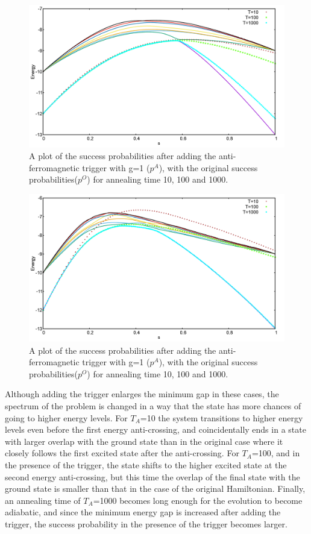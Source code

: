\documentclass[../main.tex]{subfiles}
\begin{document}
\begin{figure}[H]
\centering 
\includegraphics[scale=0.3]{705_O_T.png}
\caption{A plot of the success probabilities after adding the anti-ferromagnetic trigger with g=1 ($p^A$), with the original success probabilities($p^O$) for annealing time 10, 100 and 1000.}
\label{fig:a24}
\end{figure}
\begin{figure}[H]
\centering 
\includegraphics[scale=0.3]{705_A_T_g1.png}
\caption{A plot of the success probabilities after adding the anti-ferromagnetic trigger with g=1 ($p^A$), with the original success probabilities($p^O$) for annealing time 10, 100 and 1000.}
\label{fig:a25}
\end{figure}
Although adding the trigger enlarges the minimum gap in these cases, the spectrum of the problem is changed in a way that the state has more chances of going to higher energy levels. For $T_A$=10 the system transitions to higher energy levels even before the first energy anti-crossing, and coincidentally ends in a state with larger overlap with the ground state than in the original case where it closely follows the first excited state after the anti-crossing. For $T_A$=100, and in the presence of the trigger, the state shifts to the higher excited state at the second energy anti-crossing, but this time the overlap of the final state with the ground state is smaller than that in the case of the original Hamiltonian. Finally, an annealing time of $T_A$=1000 becomes long enough for the evolution to become adiabatic, and since the minimum energy gap is increased after adding the trigger, the success probability in the presence of the trigger becomes larger.\\
\end{document}
